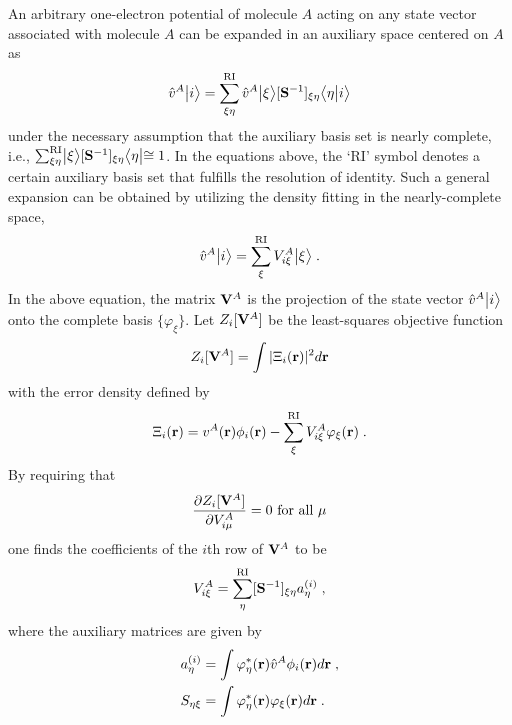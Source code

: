 An arbitrary one\hyp{}electron potential of molecule $A$ acting on any state vector 
associated with molecule $A$ can be expanded in an auxiliary space centered 
on $A$ as
%
\begin{equation}
   \hat{v}^{A}\Ket{i} = \sum_{\xi\eta}^{\rm RI} \hat{v}^{A}\Ket{\xi} [{\bf S}^{-1}]_{\xi\eta} \BraKet{\eta}{i}
\end{equation}
%
under the necessary assumption that the auxiliary basis set is nearly complete,
i.e., 
$\sum_{\xi\eta}^{\rm RI} \Ket{\xi}[{\bf S}^{-1}]_{\xi\eta} \Bra{\eta} \cong 1$.
In the equations above, 
the `RI' symbol denotes a certain auxiliary basis set that fulfills the resolution of identity. 
Such a general expansion can be obtained by 
utilizing the density fitting
in the nearly\hyp{}complete space,
%
\begin{equation} \label{e:v-compl}
 \hat{v}^{A}\Ket{i} = \sum_{\xi}^{\rm RI} V^A_{i\xi} \Ket{\xi} \;.
\end{equation}
%
In the above equation,
the matrix ${\bf V}^A$
is the projection of the state vector $\hat{v}^{A} \Ket{i}$
onto the complete basis $\{ \varphi_\xi \}$.
Let $Z_i[{\bf V}^A]$ be the least\hyp{}squares objective function 
%
\begin{equation} \label{e:z-compl}
 Z_i[{\bf V}^A] = \int \vert \Xi_i({\bf r}) \vert^2 d{\bf r}
\end{equation}
%
with the error density defined by
%
\begin{equation} \label{e:error-compl}
 \Xi_i({\bf r}) = v^A({\bf r}) \phi_i({\bf r}) - \sum_\xi^{\rm RI} V^A_{i\xi} \varphi_\xi({\bf r}) \;.
\end{equation}
%
By requiring that
%
\begin{equation} \label{e:z-necessary-requirement}
 \frac{\partial Z_i[{\bf V}^A]}{\partial V^A_{i\mu}} = 0 \text{ for all $\mu$}
\end{equation}
%
one finds the coefficients of the $i$th row of ${\bf V}^A$ to be
%
\begin{equation} \label{e:gdf-compl.v}
  V^A_{i\xi} = \sum_\eta^{\rm RI} [{\bf S}^{-1}]_{\xi\eta} a^{(i)}_\eta \;,
\end{equation}
%
where the auxiliary matrices are given by
%
\begin{subequations}
\begin{align}
 a^{(i)}_\eta &= \int \varphi^*_\eta({\bf r}) \hat{v}^A \phi_i({\bf r}) d{\bf r} \;,\\  
 S_{\eta\xi}  &= \int \varphi^*_\eta({\bf r}) \varphi_\xi({\bf r}) d{\bf r} \;.
\end{align}
\end{subequations}
